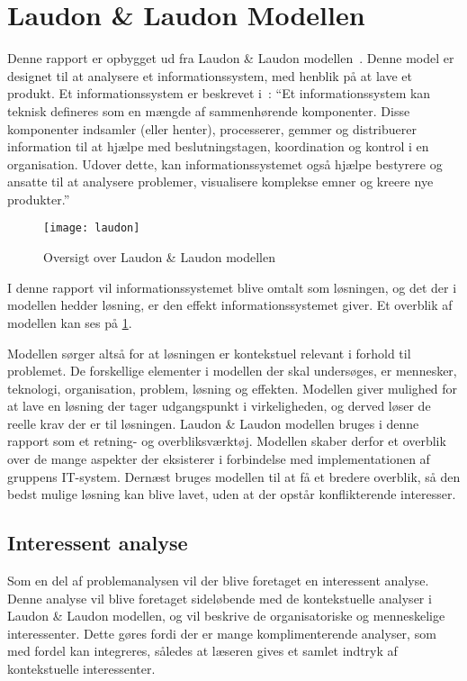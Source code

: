 \section{Laudon \& Laudon Modellen}
Denne rapport er opbygget ud fra Laudon \& Laudon modellen~\cite{laudon}. Denne model er designet til at analysere et informationssystem, med henblik på at lave et produkt. Et informationssystem er beskrevet i~\cite{laudon2006management}: \enquote{Et informationssystem kan teknisk defineres som en mængde af sammenhørende komponenter. Disse komponenter indsamler (eller henter), processerer, gemmer og distribuerer information til at hjælpe med beslutningstagen, koordination og kontrol i en organisation. Udover dette, kan informationssystemet også hjælpe bestyrere og ansatte til at analysere problemer, visualisere komplekse emner og kreere nye produkter.}

\begin{figure}
  \centering
  \texttt{[image: laudon]}
	\caption{Oversigt over Laudon \& Laudon modellen}
	\label{fig:oversigt_laudon}
\end{figure}

I denne rapport vil informationssystemet blive omtalt som løsningen, og det der i modellen hedder løsning, er den effekt informationssystemet giver. Et overblik af modellen kan ses på \cref{fig:oversigt_laudon}. 

Modellen sørger altså for at løsningen er kontekstuel relevant i forhold til problemet. De forskellige elementer i modellen der skal undersøges, er mennesker, teknologi, organisation, problem, løsning og effekten. Modellen giver mulighed for at lave en løsning der tager udgangspunkt i virkeligheden, og derved løser de reelle krav der er til løsningen. Laudon \& Laudon modellen bruges i denne rapport som et retning- og overbliksværktøj. Modellen skaber derfor et overblik over de mange aspekter der eksisterer i forbindelse med implementationen af gruppens IT-system. Dernæst bruges modellen til at få et bredere overblik, så den bedst mulige løsning kan blive lavet, uden at der opstår konflikterende interesser.

\subsection*{Interessent analyse}

Som en del af problemanalysen vil der blive foretaget en interessent analyse. Denne analyse vil blive foretaget sideløbende med de kontekstuelle analyser i Laudon \& Laudon modellen, og vil beskrive de organisatoriske og menneskelige interessenter. Dette gøres fordi der er mange komplimenterende analyser, som med fordel kan integreres, således at læseren gives et samlet indtryk af kontekstuelle interessenter. 
